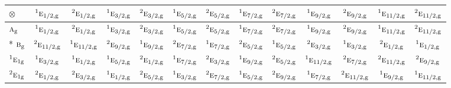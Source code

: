 \documentclass[10pt,a4paper]{article}
\numberwithin{equation}{section}
\newcommand{\irr}[1]{\text{\normalfont\scshape #1}}
\newcommand{\conjpair}[1]{{}^{#1}}
\newcommand{\ptag}[1]{\mathrm{#1}}
\newcommand{\irrprod}{\otimes}
\begin{document}
{\small\setlength{\tabcolsep}{3pt}\begin{longtable}{@{}lcccccccccccc@{}}\toprule
$\irrprod$ & $\conjpair{1}\irr{e}_{1/2,\ptag{g}}$ & $\conjpair{2}\irr{e}_{1/2,\ptag{g}}$ & $\conjpair{1}\irr{e}_{3/2,\ptag{g}}$ & $\conjpair{2}\irr{e}_{3/2,\ptag{g}}$ & $\conjpair{1}\irr{e}_{5/2,\ptag{g}}$ & $\conjpair{2}\irr{e}_{5/2,\ptag{g}}$ & $\conjpair{1}\irr{e}_{7/2,\ptag{g}}$ & $\conjpair{2}\irr{e}_{7/2,\ptag{g}}$ & $\conjpair{1}\irr{e}_{9/2,\ptag{g}}$ & $\conjpair{2}\irr{e}_{9/2,\ptag{g}}$ & $\conjpair{1}\irr{e}_{11/2,\ptag{g}}$ & $\conjpair{2}\irr{e}_{11/2,\ptag{g}}$\\\midrule\endhead
\bottomrule\endfoot\endlastfoot
$\irr{a}_{\ptag{g}}$ & $\conjpair{1}\irr{e}_{1/2,\ptag{g}}$ & $\conjpair{2}\irr{e}_{1/2,\ptag{g}}$ & $\conjpair{1}\irr{e}_{3/2,\ptag{g}}$ & $\conjpair{2}\irr{e}_{3/2,\ptag{g}}$ & $\conjpair{1}\irr{e}_{5/2,\ptag{g}}$ & $\conjpair{2}\irr{e}_{5/2,\ptag{g}}$ & $\conjpair{1}\irr{e}_{7/2,\ptag{g}}$ & $\conjpair{2}\irr{e}_{7/2,\ptag{g}}$ & $\conjpair{1}\irr{e}_{9/2,\ptag{g}}$ & $\conjpair{2}\irr{e}_{9/2,\ptag{g}}$ & $\conjpair{1}\irr{e}_{11/2,\ptag{g}}$ & $\conjpair{2}\irr{e}_{11/2,\ptag{g}}$\\*
$\irr{b}_{\ptag{g}}$ & $\conjpair{2}\irr{e}_{11/2,\ptag{g}}$ & $\conjpair{1}\irr{e}_{11/2,\ptag{g}}$ & $\conjpair{2}\irr{e}_{9/2,\ptag{g}}$ & $\conjpair{1}\irr{e}_{9/2,\ptag{g}}$ & $\conjpair{2}\irr{e}_{7/2,\ptag{g}}$ & $\conjpair{1}\irr{e}_{7/2,\ptag{g}}$ & $\conjpair{2}\irr{e}_{5/2,\ptag{g}}$ & $\conjpair{1}\irr{e}_{5/2,\ptag{g}}$ & $\conjpair{2}\irr{e}_{3/2,\ptag{g}}$ & $\conjpair{1}\irr{e}_{3/2,\ptag{g}}$ & $\conjpair{2}\irr{e}_{1/2,\ptag{g}}$ & $\conjpair{1}\irr{e}_{1/2,\ptag{g}}$\\
$\conjpair{1}\irr{e}_{1\ptag{g}}$ & $\conjpair{1}\irr{e}_{3/2,\ptag{g}}$ & $\conjpair{1}\irr{e}_{1/2,\ptag{g}}$ & $\conjpair{1}\irr{e}_{5/2,\ptag{g}}$ & $\conjpair{2}\irr{e}_{1/2,\ptag{g}}$ & $\conjpair{1}\irr{e}_{7/2,\ptag{g}}$ & $\conjpair{2}\irr{e}_{3/2,\ptag{g}}$ & $\conjpair{1}\irr{e}_{9/2,\ptag{g}}$ & $\conjpair{2}\irr{e}_{5/2,\ptag{g}}$ & $\conjpair{1}\irr{e}_{11/2,\ptag{g}}$ & $\conjpair{2}\irr{e}_{7/2,\ptag{g}}$ & $\conjpair{2}\irr{e}_{11/2,\ptag{g}}$ & $\conjpair{2}\irr{e}_{9/2,\ptag{g}}$\\
$\conjpair{2}\irr{e}_{1\ptag{g}}$ & $\conjpair{2}\irr{e}_{1/2,\ptag{g}}$ & $\conjpair{2}\irr{e}_{3/2,\ptag{g}}$ & $\conjpair{1}\irr{e}_{1/2,\ptag{g}}$ & $\conjpair{2}\irr{e}_{5/2,\ptag{g}}$ & $\conjpair{1}\irr{e}_{3/2,\ptag{g}}$ & $\conjpair{2}\irr{e}_{7/2,\ptag{g}}$ & $\conjpair{1}\irr{e}_{5/2,\ptag{g}}$ & $\conjpair{2}\irr{e}_{9/2,\ptag{g}}$ & $\conjpair{1}\irr{e}_{7/2,\ptag{g}}$ & $\conjpair{2}\irr{e}_{11/2,\ptag{g}}$ & $\conjpair{1}\irr{e}_{9/2,\ptag{g}}$ & $\conjpair{1}\irr{e}_{11/2,\ptag{g}}$\\

\end{longtable}}
\end{document}
